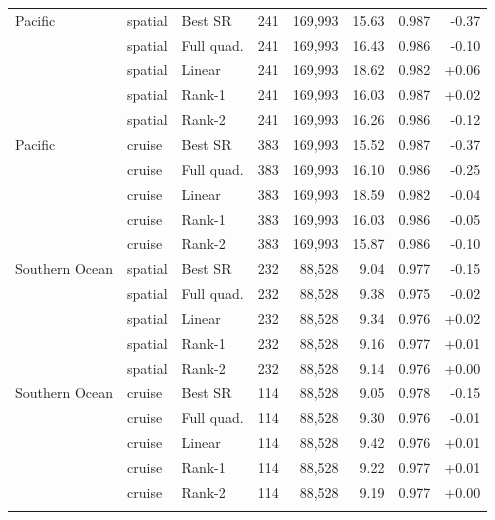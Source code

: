 \begin{table}[htbp]
\begin{tabular}{llllrrrr}
Pacific & spatial & Best SR & 241 & 169,993 & 15.63 & 0.987 & -0.37 \\
 & spatial & Full quad. & 241 & 169,993 & 16.43 & 0.986 & -0.10 \\
 & spatial & Linear & 241 & 169,993 & 18.62 & 0.982 & +0.06 \\
 & spatial & Rank-1 & 241 & 169,993 & 16.03 & 0.987 & +0.02 \\
 & spatial & Rank-2 & 241 & 169,993 & 16.26 & 0.986 & -0.12 \\
Pacific & cruise & Best SR & 383 & 169,993 & 15.52 & 0.987 & -0.37 \\
 & cruise & Full quad. & 383 & 169,993 & 16.10 & 0.986 & -0.25 \\
 & cruise & Linear & 383 & 169,993 & 18.59 & 0.982 & -0.04 \\
 & cruise & Rank-1 & 383 & 169,993 & 16.03 & 0.986 & -0.05 \\
 & cruise & Rank-2 & 383 & 169,993 & 15.87 & 0.986 & -0.10 \\
\addlinespace
Southern Ocean & spatial & Best SR & 232 & 88,528 & 9.04 & 0.977 & -0.15 \\
 & spatial & Full quad. & 232 & 88,528 & 9.38 & 0.975 & -0.02 \\
 & spatial & Linear & 232 & 88,528 & 9.34 & 0.976 & +0.02 \\
 & spatial & Rank-1 & 232 & 88,528 & 9.16 & 0.977 & +0.01 \\
 & spatial & Rank-2 & 232 & 88,528 & 9.14 & 0.976 & +0.00 \\
Southern Ocean & cruise & Best SR & 114 & 88,528 & 9.05 & 0.978 & -0.15 \\
 & cruise & Full quad. & 114 & 88,528 & 9.30 & 0.976 & -0.01 \\
 & cruise & Linear & 114 & 88,528 & 9.42 & 0.976 & +0.01 \\
 & cruise & Rank-1 & 114 & 88,528 & 9.22 & 0.977 & +0.01 \\
 & cruise & Rank-2 & 114 & 88,528 & 9.19 & 0.977 & +0.00 \\
\addlinespace
\bottomrule
\end{tabular}
\end{table}
